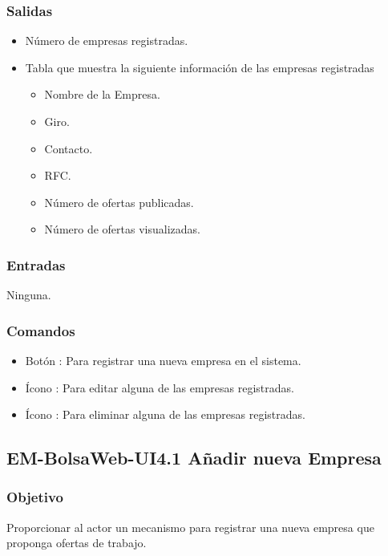 
\subsubsection{Salidas}
	\begin{itemize}
		\item Número de empresas registradas.
		\item Tabla que muestra la siguiente información de las empresas registradas
		\begin{itemize}
			\item Nombre de la Empresa.
			\item Giro.
			\item Contacto.
			\item RFC.
			\item Número de ofertas publicadas.
			\item Número de ofertas visualizadas. 
		\end{itemize}
	\end{itemize}

\subsubsection{Entradas}
	\noindent
	Ninguna.

\subsubsection{Comandos}
 	\begin{itemize}
		\item Botón : Para registrar una nueva empresa en el sistema.  
		\item Ícono : Para editar alguna de las empresas registradas.
		\item Ícono : Para eliminar alguna de las empresas registradas.
	\end{itemize}




\subsection{EM-BolsaWeb-UI4.1 Añadir nueva Empresa}

\subsubsection{Objetivo}
	\noindent
	Proporcionar al actor un mecanismo para registrar una nueva empresa que proponga ofertas de trabajo.
